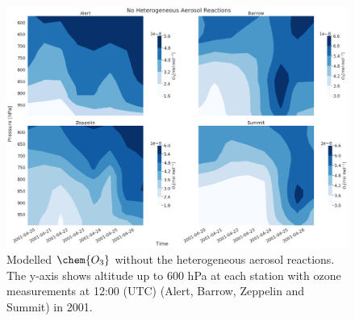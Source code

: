 \begin{figure}
    \centering
    \includegraphics[width = \linewidth]{Chapter6_Results/images/noAerosol_2001_o3.png}
    \caption{Modelled $\chem{O_3}$ without the heterogeneous aerosol reactions. The y-axis shows altitude up to 600 hPa at each station with ozone measurements at 12:00 (UTC) (Alert, Barrow, Zeppelin and Summit) in 2001.}
    \label{fig:vert_noAer_o3_2001}
\end{figure}